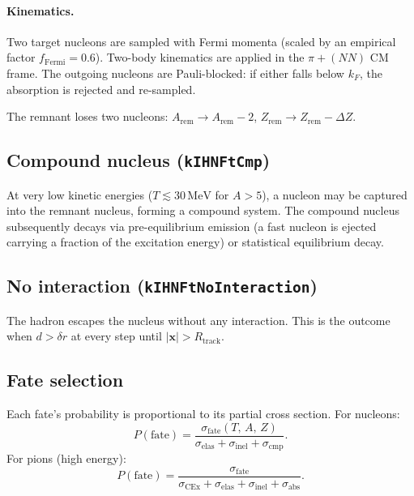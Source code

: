 \documentclass[11pt,a4paper]{article}
\newcommand{\vect}[1]{\bm{#1}}
\newcommand{\unit}[1]{\,\mathrm{#1}}
\newcommand{\MeV}{\unit{MeV}}
\begin{document}
\paragraph{Kinematics.}
Two target nucleons are sampled with Fermi momenta (scaled by an
empirical factor $f_{\text{Fermi}} = 0.6$).  Two-body kinematics are
applied in the $\pi + (NN)$ CM frame.  The outgoing nucleons are
Pauli-blocked: if either falls below $k_{F}$, the absorption is rejected
and re-sampled.

The remnant loses two nucleons: $A_{\text{rem}} \to A_{\text{rem}} - 2$,
$Z_{\text{rem}} \to Z_{\text{rem}} - \Delta Z$.

\subsection{Compound nucleus (\texttt{kIHNFtCmp})}

At very low kinetic energies ($T \lesssim 30\MeV$ for $A > 5$), a
nucleon may be captured into the remnant nucleus, forming a compound
system.  The compound nucleus subsequently decays via pre-equilibrium
emission (a fast nucleon is ejected carrying a fraction of the
excitation energy) or statistical equilibrium decay.

\subsection{No interaction (\texttt{kIHNFtNoInteraction})}

The hadron escapes the nucleus without any interaction.  This is the
outcome when $d > \delta r$ at every step until
$|\vect{x}| > R_{\text{track}}$.

\subsection{Fate selection}

Each fate's probability is proportional to its partial cross section.
For nucleons:
\begin{equation}
  P(\text{fate})
  = \frac{\sigma_{\text{fate}}(T,\,A,\,Z)}
         {\sigma_{\text{elas}} + \sigma_{\text{inel}} + \sigma_{\text{cmp}}}.
\end{equation}
For pions (high energy):
\begin{equation}
  P(\text{fate})
  = \frac{\sigma_{\text{fate}}}
         {\sigma_{\text{CEx}} + \sigma_{\text{elas}} + \sigma_{\text{inel}}
          + \sigma_{\text{abs}}}.
\end{equation}
\end{document}
